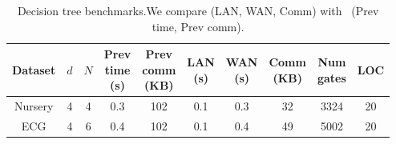 





\setlength\tabcolsep{3.8pt}

\begin{table}[t]
\footnotesize
\begin{tabular}{|c|c|c|c|c|c|c|c|c|c|}
\hline
Dataset  & $d$ & $N$ & \thead{Prev \\ time\\ (s)} & \thead{Prev \\ comm\\ (KB)} & \thead{LAN  \\ (s)} & \thead{WAN\\ (s)} & \thead{Comm \\(KB)}& \thead{Num \\ gates} & LOC\\
\hline
Nursery & 4 & 4 & 0.3 & 102 & 0.1 & 0.3 & 32 & 3324 & 20\\
\hline
ECG & 4 &  6 & 0.4 & 102 & 0.1 & 0.4 & 49  & 5002 & 20\\
\hline
\end{tabular}
\caption{Decision tree benchmarks.We compare \tool (LAN, WAN, Comm)
 with~\cite{wu} (Prev time, Prev comm).}
 \label{tab:dt} 
\end{table}


